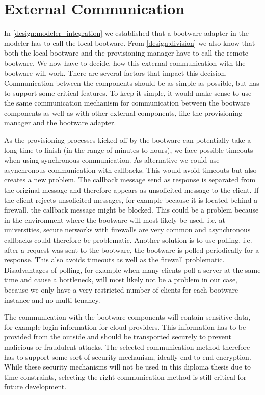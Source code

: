 \section{External Communication}
\label{design:communication}

In \autoref{design:modeler_integration} we established that a bootware adapter in the modeler has to call the local bootware.
From \autoref{design:division} we also know that both the local bootware and the provisioning manager have to call the remote bootware.
We now have to decide, how this external communication with the bootware will work.
There are several factors that impact this decision.
Communication between the components should be as simple as possible, but has to support some critical features.
To keep it simple, it would make sense to use the same communication mechanism for communication between the bootware components as well as with other external components, like the provisioning manager and the bootware adapter.

As the provisioning processes kicked off by the bootware can potentially take a long time to finish (in the range of minutes to hours), we face possible timeouts when using synchronous communication.
As alternative we could use asynchronous communication with callbacks.
This would avoid timeouts but also creates a new problem.
The callback message send as response is separated from the original message and therefore appears as unsolicited message to the client.
If the client rejects unsolicited messages, for example because it is located behind a firewall, the callback message might be blocked.
This could be a problem because in the environment where the bootware will most likely be used, i.e. at universities, secure networks with firewalls are very common and asynchronous callbacks could therefore be problematic.
Another solution is to use polling, i.e. after a request was sent to the bootware, the bootware is polled periodically for a response.
This also avoids timeouts as well as the firewall problematic.
Disadvantages of polling, for example when many clients poll a server at the same time and cause a bottleneck, will most likely not be a problem in our case, because we only have a very restricted number of clients for each bootware instance and no multi-tenancy.

The communication with the bootware components will contain sensitive data, for example login information for cloud providers.
This information has to be provided from the outside and should be transported securely to prevent malicious or fraudulent attacks.
The selected communication method therefore has to support some sort of security mechanism, ideally end-to-end encryption.
While these security mechanisms will not be used in this diploma thesis due to time constraints, selecting the right communication method is still critical for future development.

